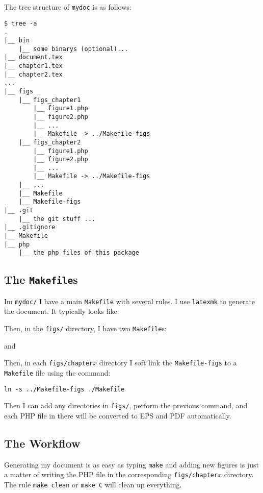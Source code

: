 \documentclass[10pt,a4paper]{scrartcl}
\begin{document}
The tree structure of \texttt{mydoc} is as follows:
\begin{lstlisting}
$ tree -a
.
|__ bin
    |__ some binarys (optional)...
|__ document.tex
|__ chapter1.tex
|__ chapter2.tex
...
|__ figs
    |__ figs_chapter1
        |__ figure1.php
        |__ figure2.php
        |__ ...
        |__ Makefile -> ../Makefile-figs
    |__ figs_chapter2
        |__ figure1.php
        |__ figure2.php
        |__ ...
        |__ Makefile -> ../Makefile-figs
    |__ ...
    |__ Makefile
    |__ Makefile-figs
|__ .git
    |__ the git stuff ...
|__ .gitignore
|__ Makefile
|__ php
    |__ the php files of this package
\end{lstlisting}

\subsection{The \texttt{Makefile}s}
Im \texttt{mydoc/} I have a main \texttt{Makefile} with several rules. I use
\texttt{latexmk} to generate the document. It typically looks like:


Then, in the \texttt{figs/} directory, I have two \texttt{Makefile}s:

and

Then, in each \texttt{figs/chapter$x$} directory I soft link the \texttt{Makefile-figs}
to a \texttt{Makefile} file using the command:
\begin{center}
\texttt{ln -s ../Makefile-figs ./Makefile}
\end{center}
Then I can add any directories in \texttt{figs/}, perform the previous command, and each PHP
file in there will be converted to EPS and PDF automatically.

\subsection{The Workflow}
Generating my document is as easy as typing \lstinline{make} and adding new figures is just a matter
of writing the PHP file in the corresponding \texttt{figs/chapter$x$} directory.
The rule \texttt{make clean} or \texttt{make C} will clean up everything.
\end{document}
